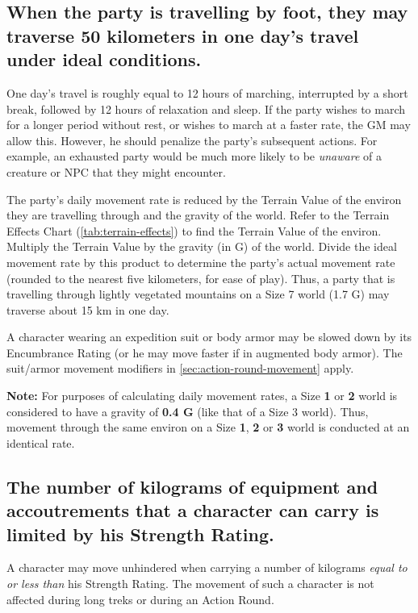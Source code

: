 \subsection[Travelling By Foot]{When the party is travelling by foot,
  they may traverse 50 kilometers in one day's travel under ideal
  conditions.} 
\label{sec:foot-travel}



One day's travel is roughly equal to 12 hours of marching, interrupted
by a short break, followed by 12 hours of relaxation and sleep. If the
party wishes to march for a longer period without rest, or wishes to
march at a faster rate, the GM may allow this. However, he should
penalize the party's subsequent actions. For example, an exhausted
party would be much more likely to be \emph{unaware} of a creature or
NPC that they might encounter.

The party's daily movement rate is reduced by the Terrain Value of the
environ they are travelling through and the gravity of the world.
Refer to the Terrain Effects Chart (\ref{tab:terrain-effects}) 
to find the Terrain Value of the
environ. Multiply the Terrain Value by the gravity (in G) of the
world.  Divide the ideal movement rate by this product to determine
the party's actual movement rate (rounded to the nearest five
kilometers, for ease of play). Thus, a party that is travelling
through lightly vegetated mountains on a Size 7 world (1.7 G) may
traverse about 15 km in one day.

A character wearing an expedition suit or body armor may be slowed
down by its Encumbrance Rating (or he may move faster if in augmented
body armor). The suit/armor movement modifiers in
\ref{sec:action-round-movement} 
apply.

\textbf{Note:} For purposes of calculating daily movement rates, a
Size \textbf{1} or \textbf{2} world is considered to have a gravity of
\textbf{0.4 G} (like that of a Size 3 world). Thus, movement through
the same environ on a Size \textbf{1}, \textbf{2} or \textbf{3} world
is conducted at an identical rate.


\subsection[Carrying Equipment]{The number of kilograms of equipment
  and accoutrements that a character can carry is limited by his
  Strength Rating.}
\label{sec:carrying-equipment}



A character may move unhindered when carrying a number of kilograms
\emph{equal to or less than} his Strength Rating. The movement of such a
character is not affected during long treks or during an Action Round.

